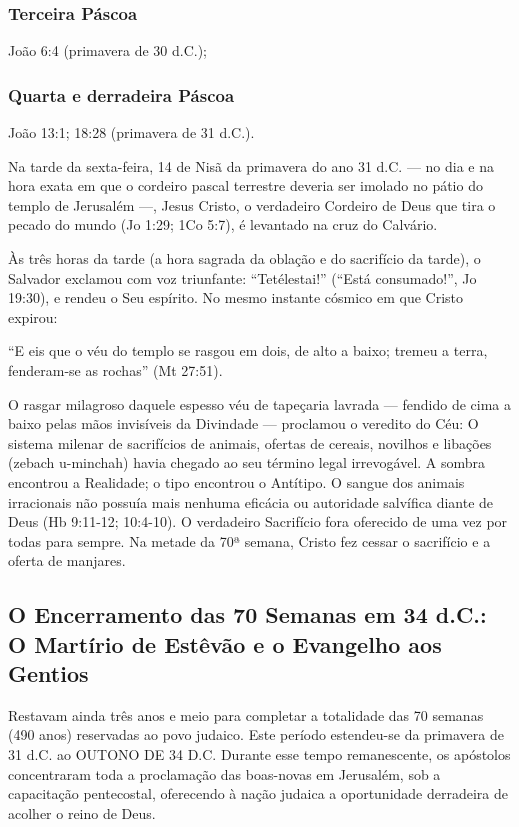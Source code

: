 \documentclass[11pt,a4paper,openany]{book}
\begin{document}
\subsubsection*{Terceira Páscoa}
João 6:4 (primavera de 30 d.C.);

\subsubsection*{Quarta e derradeira Páscoa}
João 13:1; 18:28 (primavera de 31 d.C.).

Na tarde da sexta-feira, 14 de Nisã da primavera do ano 31 d.C. — no dia e na hora exata em que o cordeiro pascal terrestre deveria ser imolado no pátio do templo de Jerusalém —, Jesus Cristo, o verdadeiro Cordeiro de Deus que tira o pecado do mundo (Jo 1:29; 1Co 5:7), é levantado na cruz do Calvário.

Às três horas da tarde (a hora sagrada da oblação e do sacrifício da tarde), o Salvador exclamou com voz triunfante: ``Tetélestai!'' (``Está consumado!'', Jo 19:30), e rendeu o Seu espírito. No mesmo instante cósmico em que Cristo expirou:

``E eis que o véu do templo se rasgou em dois, de alto a baixo; tremeu a terra, fenderam-se as rochas'' (Mt 27:51).

O rasgar milagroso daquele espesso véu de tapeçaria lavrada — fendido de cima a baixo pelas mãos invisíveis da Divindade — proclamou o veredito do Céu: O sistema milenar de sacrifícios de animais, ofertas de cereais, novilhos e libações (zebach u-minchah) havia chegado ao seu término legal irrevogável. A sombra encontrou a Realidade; o tipo encontrou o Antítipo. O sangue dos animais irracionais não possuía mais nenhuma eficácia ou autoridade salvífica diante de Deus (Hb 9:11-12; 10:4-10). O verdadeiro Sacrifício fora oferecido de uma vez por todas para sempre. Na metade da 70ª semana, Cristo fez cessar o sacrifício e a oferta de manjares.



\subsection{O Encerramento das 70 Semanas em 34 d.C.: O Martírio de Estêvão e o Evangelho aos Gentios}


Restavam ainda três anos e meio para completar a totalidade das 70 semanas (490 anos) reservadas ao povo judaico. Este período estendeu-se da primavera de 31 d.C. ao OUTONO DE 34 D.C. Durante esse tempo remanescente, os apóstolos concentraram toda a proclamação das boas-novas em Jerusalém, sob a capacitação pentecostal, oferecendo à nação judaica a oportunidade derradeira de acolher o reino de Deus.
\end{document}
